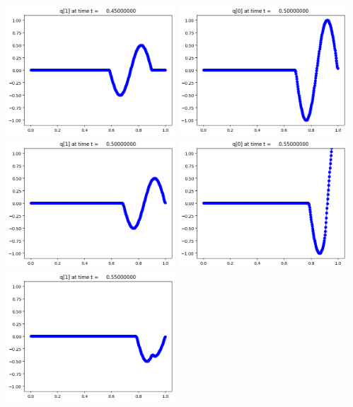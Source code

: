 \documentclass[11pt]{article}
\begin{document}
\includegraphics[width=0.475\textwidth]{frame0009fig1.png}
\vskip 10pt 
\includegraphics[width=0.475\textwidth]{frame0010fig0.png}
\includegraphics[width=0.475\textwidth]{frame0010fig1.png}
\vskip 10pt 
\includegraphics[width=0.475\textwidth]{frame0011fig0.png}
\includegraphics[width=0.475\textwidth]{frame0011fig1.png}
\end{document}
